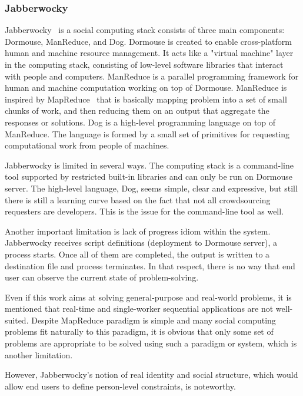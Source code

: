 \subsubsection{Jabberwocky}
Jabberwocky~\cite{Ahmad2011} is a social computing stack consists of three 
main components: Dormouse, ManReduce, and Dog. Dormouse is created to 
enable cross-platform human and machine resource management. It acts like a 
"virtual machine" layer in the computing stack, consisting of low-level software 
libraries that interact with people and computers. ManReduce is a parallel 
programming framework for human and machine computation working on top 
of Dormouse. ManReduce is inspired by MapReduce~\cite{Dean2008} that is 
basically mapping problem into a set of small chunks of work, and then reducing 
them on an output that aggregate the responses or solutions. Dog is a high-level 
programming language on top of ManReduce. The language is formed by a small 
set of primitives for requesting computational work from people of machines. 

Jabberwocky is limited in several ways. The computing stack is a command-line 
tool supported by restricted built-in libraries and can only be run on Dormouse server. 
The high-level language, Dog, seems simple, clear and expressive, but still there is 
still a learning curve based on the fact that not all crowdsourcing requesters are 
developers. This is the issue for the command-line tool as well.

Another important limitation is lack of progress idiom within the system. 
Jabberwocky receives script definitions (deployment to Dormouse server), 
a process starts. Once all of them are completed, the output is written to a destination 
file and process terminates. In that respect, there is no way that end user can 
observe the current state of problem-solving.

Even if this work aims at solving general-purpose and real-world problems, 
it is mentioned that real-time and single-worker sequential applications are not 
well-suited. Despite MapReduce paradigm is simple and many social computing 
problems fit naturally to this paradigm, it is obvious that only some set of problems are 
appropriate to be solved using such a paradigm or system, which is another limitation. 

However, Jabberwocky's notion of real identity and social structure, 
which would allow end users to define person-level constraints, is noteworthy.



